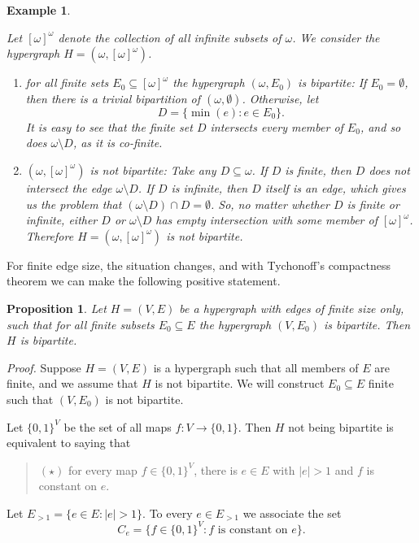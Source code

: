 \documentclass[12pt]{amsart}
\newtheorem{proposition}[lemma]{\bf Proposition}
\newtheorem{example}[lemma]{\bf Example}
\begin{document}
\begin{example} \label{omegaex} 
{\em Let $[\omega]^\omega$ denote the collection of 
all infinite subsets of $\omega$. We consider the hypergraph $H = 
(\omega, [\omega]^\omega)$.

\begin{enumerate}
    \item for all finite sets $E_0\subseteq [\omega]^\omega$
the hypergraph $(\omega, E_0)$ is bipartite: If $E_0 = \emptyset$, then 
there is a trivial bipartition of 
$(\omega, \emptyset)$. Otherwise, let $$D =
\{ \min(e) : e \in E_0\}.$$ It is easy to 
see that the finite set $D$ intersects every member
of $E_0$, and so does $\omega\setminus D$, as
it is co-finite.
    \item $(\omega, [\omega]^\omega)$ is not bipartite:
    Take any $D \subseteq \omega$. If $D$ is finite,
    then $D$ does not intersect the edge $\omega\setminus D$.
    If $D$ is infinite, then $D$ itself is an edge, which
    gives us the problem that $(\omega\setminus D) \cap D =
    \emptyset$. So, no matter whether $D$ is finite or
    infinite, either $D$ or $\omega\setminus D$ has
    empty intersection with some member of $[\omega]^\omega$.
    Therefore $H = (\omega, [\omega]^\omega)$ is not bipartite.
\end{enumerate}
}
\end{example}
For finite edge size, the situation changes, and with Tychonoff's compactness
theorem \cite{Ty} we can make the following positive statement.

\begin{proposition}\label{compactnessprop}
Let $H= (V,E)$  be a hypergraph with edges of finite size only, such that for 
all finite subsets $E_0\subseteq E$ the hypergraph $(V, E_0)$ is bipartite. 
Then $H$ is bipartite.
\end{proposition}

{\em Proof.} Suppose $H=(V,E)$ is a hypergraph such that all members 
of $E$ are finite, and we assume that $H$ is not bipartite.
We will construct $E_0\subseteq E$ finite such that $(V, E_0)$ is not bipartite.

Let $\{0,1\}^V$ be the set of all maps $f: V \to \{0,1\}$. Then $H$ not 
being bipartite is equivalent to saying that \begin{quote} $(\star)$ 
for every map $f\in \{0,1\}^V$, there is
$e\in E$ with $|e|>1$ and $f$ is constant on $e$. \end{quote}

Let $E_{>1} = \{e\in E: |e|>1\}$. To every $e\in E_{>1}$ we 
associate the set $$C_e = \{f\in \{0,1\}^V: f\text{ is constant on }e\}.$$ 
\end{document}
